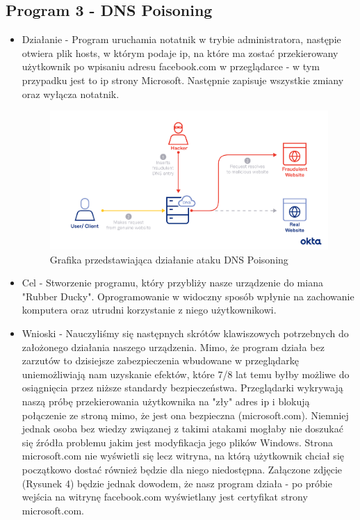 \documentclass{article}
\begin{document}
\subsection{Program 3 - DNS Poisoning}
    \begin{itemize}
        \item Działanie - Program uruchamia notatnik w trybie administratora, następie otwiera plik hosts, w którym podaje ip, na które ma zostać przekierowany użytkownik po wpisaniu adresu facebook.com w przeglądarce - w tym przypadku jest to ip strony Microsoft. Następnie zapisuje wszystkie zmiany oraz wyłącza notatnik.
        \begin{figure}[h]
    \centering
    \includegraphics[scale=0.1]{Media/DNS1.png}
    \caption{Grafika przedstawiająca działanie ataku DNS Poisoning}
    \label{fig:enter-label}
    \end{figure}
        \item Cel - Stworzenie programu, który przybliży nasze urządzenie do miana "Rubber Ducky". Oprogramowanie w widoczny sposób wpłynie na zachowanie komputera oraz utrudni korzystanie z niego użytkownikowi.
        \item Wnioski - Nauczyliśmy się następnych skrótów klawiszowych potrzebnych do założonego działania naszego urządzenia. Mimo, że program działa bez zarzutów to dzisiejsze zabezpieczenia wbudowane w przeglądarkę uniemożliwiają nam uzyskanie efektów, które 7/8 lat temu byłby możliwe do osiągnięcia przez niższe standardy bezpieczeństwa. Przeglądarki wykrywają naszą próbę przekierowania użytkownika na "zły" adres ip i blokują połączenie ze stroną mimo, że jest ona bezpieczna (microsoft.com). Niemniej jednak osoba bez wiedzy związanej z takimi atakami mogłaby nie doszukać się źródła problemu jakim jest modyfikacja jego plików Windows. Strona microsoft.com nie wyświetli się lecz witryna, na którą użytkownik chciał się początkowo dostać również będzie dla niego niedostępna. Załączone zdjęcie (Rysunek 4) będzie jednak dowodem, że nasz program działa - po próbie wejścia na witrynę facebook.com wyświetlany jest certyfikat strony microsoft.com.

\end{itemize}
\end{document}
